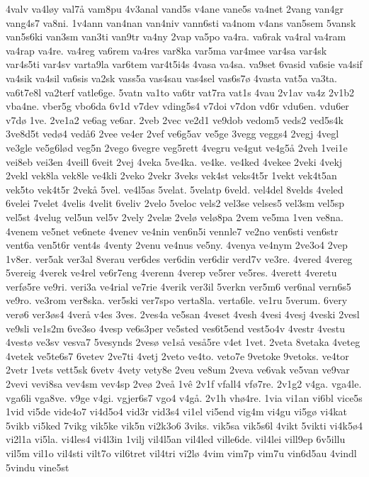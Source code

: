 {4valv
va4løy
val7å
vam8pu
4v3anal
vand5s
v4ane
vane5s
va4net
2vang
van4gr
vang4s7
va8ni.
1v4ann
van4nan
van4niv
vann6sti
va4nom
v4ans
van5sem
5vansk
van5s6ki
van3sm
van3ti
van9tr
va4ny
2vap
va5po
va4ra.
va6rak
va4ral
va4ram
va4rap
va4re.
va4reg
va6rem
va4res
var8ka
var5ma
var4mee
var4sa
var4sk
var4s5ti
var4sv
varta9la
var6tem
var4t5i4s
4vasa
va4sa.
va9set
6vasid
va6sie
va4sif
va4sik
va4sil
va6sis
va2sk
vass5a
vas4sau
vas4sel
vas6s7ø
4vasta
vat5a
va3ta.
va6t7e8l
va2terf
vatle6ge.
5vatn
va1to
va6tr
vat7ra
vat1s
4vau
2v1av
va4z
2v1b2
vba4ne.
vber5g
vbo6da
6v1d
v7dev
vding5s4
v7doi
v7don
vd6r
vdu6en.
vdu6er
v7dø
1ve.
2ve1a2
ve6ag
ve6ar.
2veb
2vec
ve2d1
ve9dob
vedom5
veds2
ved5s4k
3ve8d5t
vedø4
vedå6
2vee
ve4er
2vef
ve6g5av
ve5ge
3vegg
veggs4
2vegj
4vegl
ve3gle
ve5g6lød
veg5n
2vego
6vegre
veg5rett
4vegru
ve4gut
ve4g5å
2veh
1vei1e
vei8eb
vei3en
4veill
6veit
2vej
4veka
5ve4ka.
ve4ke.
ve4ked
4vekee
2veki
4vekj
2vekl
vek8la
vek8le
ve4kli
2veko
2vekr
3veks
vek4st
veks4t5r
1vekt
vek4t5an
vek5to
vek4t5r
2vekå
5vel.
ve4l5as
5velat.
5velatp
6veld.
vel4del
8velds
4veled
6velei
7velet
4velis
4velit
6veliv
2velo
5veloc
vels2
vel3se
velses5
vel3sm
vel5sp
vel5st
4velug
vel5un
vel5v
2vely
2velæ
2velø
velø8pa
2vem
ve5ma
1ven
ve8na.
4venem
ve5net
ve6nete
4venev
ve4nin
ven6n5i
vennle7
ve2no
ven6sti
ven6str
vent6a
ven5t6r
vent4s
4venty
2venu
ve4nus
ve5ny.
4venya
ve4nym
2ve3o4
2vep
1v8er.
ver5ak
ver3al
8verau
ver6des
ver6din
ver6dir
verd7v
ve3re.
4vered
4vereg
5vereig
4verek
ve4rel
ve6r7eng
4verenn
4verep
ve5rer
ve5res.
4verett
4veretu
verfø5re
ve9ri.
veri3a
ve4rial
ve7rie
4verik
ver3il
5verkn
ver5m6
ver6nal
vern6s5
ve9ro.
ve3rom
ver8ska.
ver5ski
ver7spo
verta8la.
verta6le.
ve1ru
5verum.
6very
verø6
ver3øs4
4verå
v4es
3ves.
2ves4a
ve5san
4veset
4vesh
4vesi
4vesj
4veski
2vesl
ve9sli
ve1s2m
6ve3so
4vesp
ve6s3per
ve5sted
ves6t5end
vest5o4v
4vestr
4vestu
4vestø
ve3sv
vesva7
5vesynds
2vesø
ve1så
veså5re
v4et
1vet.
2veta
8vetaka
4veteg
4vetek
ve5te6s7
6vetev
2ve7ti
4vetj
2veto
ve4to.
veto7e
9vetoke
9vetoks.
ve4tor
2vetr
1vets
vett5sk
6vetv
4vety
vety8e
2veu
ve8um
2veva
ve6vak
ve5van
ve9var
2vevi
vevi8sa
vev4sm
vev4sp
2veø
2veå
1vê
2v1f
vfall4
vfø7re.
2v1g2
v4ga.
vga4le.
vga6li
vga8ve.
v9ge
v4gi.
vgjer6s7
vgo4
v4gå.
2v1h
vhø4re.
1via
vi1an
vi6bl
vice5s
1vid
vi5de
vide4o7
vi4d5o4
vid3r
vid3s4
vi1el
vi5end
vig4m
vi4gu
vi5gø
vi4kat
5vikb
vi5ked
7vikg
vik5ke
vik5n
vi2k3o6
3viks.
vik5sa
vik5s6l
4vikt
5vikti
vi4k5ø4
vi2l1a
vi5la.
vi4les4
vi4l3in
1vilj
vil4l5an
vil4led
ville6de.
vil4lei
vill9ep
6v5illu
vil5m
vil1o
vil4sti
vilt7o
vil6tret
vil4tri
vi2lø
4vim
vim7p
vim7u
vin6d5au
4vindl
5vindu
vine5st
}
